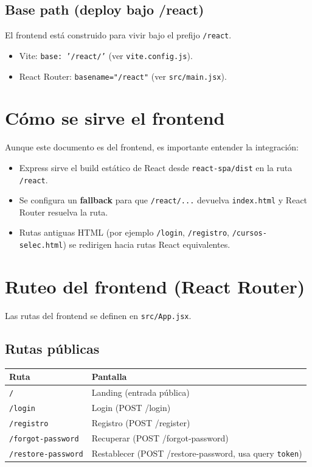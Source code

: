 \documentclass[12pt,a4paper]{article}
\begin{document}
\subsection{Base path (deploy bajo /react)}
El frontend est\'a construido para vivir bajo el prefijo \texttt{/react}.

\begin{itemize}[leftmargin=*]
  \item Vite: \texttt{base: '/react/'} (ver \texttt{vite.config.js}).
  \item React Router: \texttt{basename="/react"} (ver \texttt{src/main.jsx}).
\end{itemize}

\section{C\'omo se sirve el frontend}
Aunque este documento es del frontend, es importante entender la integraci\'on:

\begin{itemize}[leftmargin=*]
  \item Express sirve el build est\'atico de React desde \texttt{react-spa/dist} en la ruta \texttt{/react}.
  \item Se configura un \textbf{fallback} para que \texttt{/react/...} devuelva \texttt{index.html} y React Router resuelva la ruta.
  \item Rutas antiguas HTML (por ejemplo \texttt{/login}, \texttt{/registro}, \texttt{/cursos-selec.html}) se redirigen hacia rutas React equivalentes.
\end{itemize}

\section{Ruteo del frontend (React Router)}
Las rutas del frontend se definen en \texttt{src/App.jsx}.

\subsection{Rutas p\'ublicas}
\begin{longtable}{|>{\raggedright\arraybackslash}p{3.5cm}|>{\raggedright\arraybackslash}p{10cm}|}
\hline
\textbf{Ruta} & \textbf{Pantalla} \\
\hline
\texttt{/} & Landing (entrada p\'ublica) \\
\hline
\texttt{/login} & Login (POST /login) \\
\hline
\texttt{/registro} & Registro (POST /register) \\
\hline
\texttt{/forgot-password} & Recuperar (POST /forgot-password) \\
\hline
\texttt{/restore-password} & Restablecer (POST /restore-password, usa query \texttt{token}) \\
\hline
\end{longtable}
\end{document}
